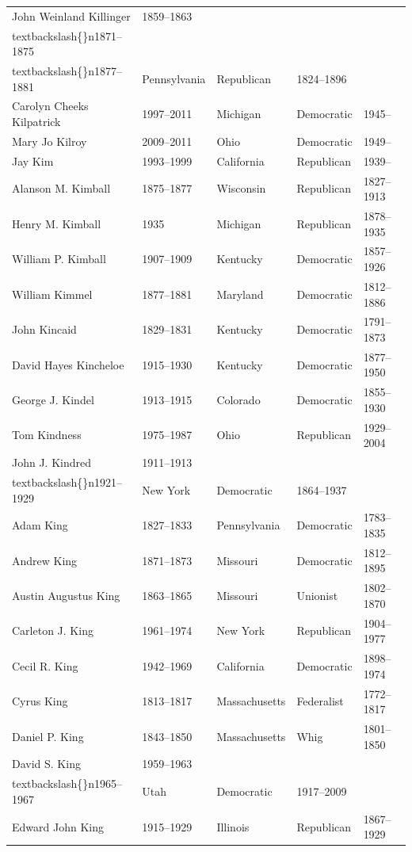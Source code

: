 \documentclass{article}
\begin{document}
\begin{tabular}{lllll}
John Weinland Killinger & 1859–1863\\textbackslash\{\}n1871–1875\\textbackslash\{\}n1877–1881 & Pennsylvania & Republican & 1824–1896 \\
Carolyn Cheeks Kilpatrick & 1997–2011 & Michigan & Democratic & 1945– \\
Mary Jo Kilroy & 2009–2011 & Ohio & Democratic & 1949– \\
Jay Kim & 1993–1999 & California & Republican & 1939– \\
Alanson M. Kimball & 1875–1877 & Wisconsin & Republican & 1827–1913 \\
Henry M. Kimball & 1935 & Michigan & Republican & 1878–1935 \\
William P. Kimball & 1907–1909 & Kentucky & Democratic & 1857–1926 \\
William Kimmel & 1877–1881 & Maryland & Democratic & 1812–1886 \\
John Kincaid & 1829–1831 & Kentucky & Democratic & 1791–1873 \\
David Hayes Kincheloe & 1915–1930 & Kentucky & Democratic & 1877–1950 \\
George J. Kindel & 1913–1915 & Colorado & Democratic & 1855–1930 \\
Tom Kindness & 1975–1987 & Ohio & Republican & 1929–2004 \\
John J. Kindred & 1911–1913\\textbackslash\{\}n1921–1929 & New York & Democratic & 1864–1937 \\
Adam King & 1827–1833 & Pennsylvania & Democratic & 1783–1835 \\
Andrew King & 1871–1873 & Missouri & Democratic & 1812–1895 \\
Austin Augustus King & 1863–1865 & Missouri & Unionist & 1802–1870 \\
Carleton J. King & 1961–1974 & New York & Republican & 1904–1977 \\
Cecil R. King & 1942–1969 & California & Democratic & 1898–1974 \\
Cyrus King & 1813–1817 & Massachusetts & Federalist & 1772–1817 \\
Daniel P. King & 1843–1850 & Massachusetts & Whig & 1801–1850 \\
David S. King & 1959–1963\\textbackslash\{\}n1965–1967 & Utah & Democratic & 1917–2009 \\
Edward John King & 1915–1929 & Illinois & Republican & 1867–1929 \\

\end{tabular}
\end{document}
